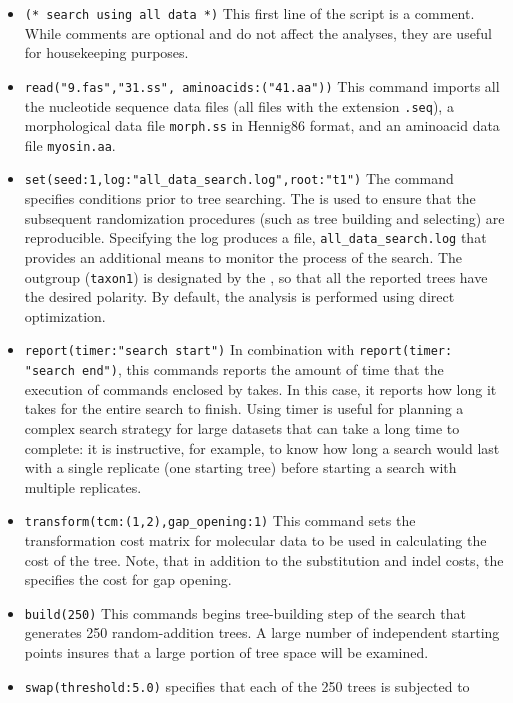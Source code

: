 \begin{itemize}
\item \texttt{(* search using all data *)} This first line of the script is a comment. While comments are optional 
and do not affect the analyses, they are useful for housekeeping purposes.
\item \texttt{read("9.fas","31.ss", aminoacids:("41.aa"))}
This command imports all the nucleotide sequence data files (all files with the extension \texttt{.seq}), a 
morphological data file \texttt{morph.ss} in Hennig86 format, and an aminoacid data file \texttt{myosin.aa}.
\item \texttt{set(seed:1,log:"all\_data\_search.log",root:"t1")} The  command specifies 
conditions prior to tree searching. The  is used to ensure that the subsequent 
randomization procedures (such as tree building and selecting) are reproducible. Specifying the log 
produces a file, \texttt{all\_data\_search.log} that provides an additional means to monitor the process 
of the search. The outgroup (\texttt{taxon1}) is designated by the , so that all the 
reported trees have the desired polarity. By default, the analysis is performed using direct optimization.
\item \texttt{report(timer:"search start")} In combination with \texttt{report(timer:\\"search end")}, this commands 
reports the amount of time that the execution of commands enclosed by  takes. In this 
case, it reports how long it takes for the entire search to finish. Using timer is useful for planning a complex 
search strategy for large datasets that can take a long time to complete: it is instructive, for example, to know 
how 
long a search would last with a single replicate (one starting tree) before starting a search with multiple 
replicates.
\item \texttt{transform(tcm:(1,2),gap\_opening:1)} This command sets the \\transformation cost matrix for 
molecular data to be used in calculating the cost of the tree. Note, that in addition to the substitution and 
indel costs, the  specifies the cost for gap opening.
\item \texttt{build(250)} This commands begins tree-building step of the search that generates 250 
random-addition trees. A large number of independent starting points insures that a large portion of tree 
space will be examined.
\item \texttt{swap(threshold:5.0)}  specifies that each of the 250 trees is subjected to 

\end{itemize}
